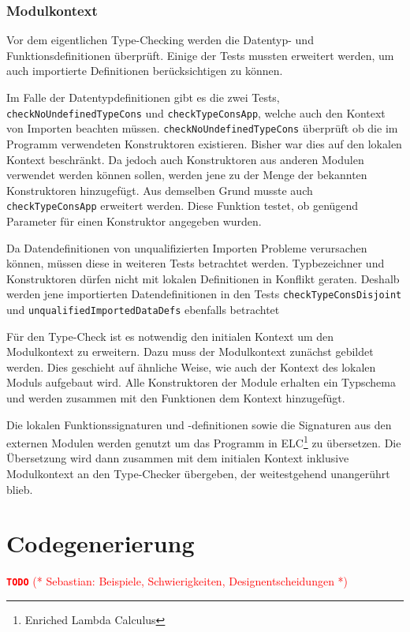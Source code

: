 \documentclass[runningheads]{llncs}
\newcommand{\TODO}[1]{ \textcolor{red}{\textbf{\texttt{\large{TODO}}} (* #1 *)}\par}
\begin{document}
\subsubsection{Modulkontext}

Vor dem eigentlichen Type-Checking werden die Datentyp- und Funktionsdefinitionen überprüft. Einige der Tests mussten erweitert werden, um auch importierte Definitionen berücksichtigen zu können.

Im Falle der Datentypdefinitionen gibt es die zwei Tests, \verb|checkNoUndefinedTypeCons| und \verb|checkTypeConsApp|, welche auch den Kontext von Importen beachten müssen. \verb|checkNoUndefinedTypeCons| überprüft ob die im Programm verwendeten Konstruktoren existieren. Bisher war dies auf den lokalen Kontext beschränkt. Da jedoch auch Konstruktoren aus anderen Modulen verwendet werden können sollen, werden jene zu der Menge der bekannten Konstruktoren hinzugefügt. Aus demselben Grund musste auch \verb|checkTypeConsApp| erweitert werden. Diese Funktion testet, ob genügend Parameter für einen Konstruktor angegeben wurden.

Da Datendefinitionen von unqualifizierten Importen Probleme verursachen können, müssen diese in weiteren Tests betrachtet werden. Typbezeichner und Konstruktoren dürfen nicht mit lokalen Definitionen in Konflikt geraten. Deshalb werden jene importierten Datendefinitionen in den Tests \verb|checkTypeConsDisjoint| und \verb|unqualifiedImportedDataDefs| ebenfalls betrachtet

Für den Type-Check ist es notwendig den initialen Kontext um den Modulkontext zu erweitern. Dazu muss der Modulkontext zunächst gebildet werden. Dies geschieht auf ähnliche Weise, wie auch der Kontext des lokalen Moduls aufgebaut wird. Alle Konstruktoren der Module erhalten ein Typschema und werden zusammen mit den Funktionen dem Kontext hinzugefügt.

Die lokalen Funktionssignaturen und -definitionen sowie die Signaturen aus den externen Modulen werden genutzt um das Programm in ELC\footnote{Enriched Lambda Calculus} zu übersetzen. Die Übersetzung wird dann zusammen mit dem initialen Kontext inklusive Modulkontext an den Type-Checker übergeben, der weitestgehend unangerührt blieb.

\section{Codegenerierung}\label{sec:codegen}

\TODO{Sebastian: Beispiele, Schwierigkeiten, Designentscheidungen}
\end{document}
